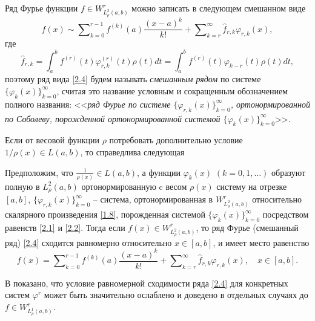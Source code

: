 Ряд Фурье функции $f\in W^r_{L^2_\rho(a,b)}$ можно записать в следующем смешанном виде
\begin{equation}\label{2.4}
f(x)\sim \sum\nolimits_{k=0}^{r-1} f^{(k)}(a)\frac{(x-a)^k}{k!}+ \sum\nolimits_{k=r}^\infty \hat f_{r,k}\varphi_{r,k}(x),
\end{equation}
где
\begin{equation}\label{2.5}
\hat f_{r,k}=\int_a^b f^{(r)}(t) \varphi^{(r)}_{r,k}(t)\rho(t)dt=\int_a^b f^{(r)}(t) \varphi_{k-r}(t)\rho(t)dt,
\end{equation}
поэтому ряд  вида \eqref{2.4} будем  называть \textit{смешанным рядом} по  системе $\{\varphi_{k}(x)\}_{k=0}^\infty$, считая это название условным и сокращенным обозначением полного названия: <<\textit{ряд Фурье по системе  $\{\varphi_{r,k}(x)\}_{k=0}^\infty$, ортонормированной по Соболеву, порожденной ортонормированной системой $\{\varphi_{k}(x)\}_{k=0}^\infty$}>>.


Если от весовой функции $\rho$ потребовать дополнительно условие $1/\rho(x)\in L(a,b)$, то   справедлива \cite{SharIzv2018}
следующая
\begin{theorem}\label{th2} Предположим, что  $ \frac{1}{\rho(x)}\in L(a,b) $, а  функции $\varphi_k(x)$ $(k=0,1,\ldots)$  образуют полную в $L^2_\rho(a,b)$ ортонормированную   c весом   $\rho(x)$ систему на отрезке $[a,b]$, $\{\varphi_{r,k}(x)\}_{k=0}^\infty$ -- система, ортонормированная в $W^r_{L^2_\rho(a,b)}$ относительно скалярного произведения \eqref{1.8},  порожденная системой $\{\varphi_{k}(x)\}_{k=0}^\infty$ посредством равенств \eqref{2.1} и \eqref{2.2}. Тогда если $f(x)\in W^r_{L^2_\rho(a,b)}$, то ряд Фурье (смешанный ряд) \eqref{2.4} сходится  равномерно относительно $x\in[a,b]$, и имеет место равенство
	\begin{equation*}
	f(x)= \sum\nolimits_{k=0}^{r-1} f^{(k)}(a)\frac{(x-a)^k}{k!}+ \sum\nolimits_{k=r}^\infty \hat f_{r,k}\varphi_{r,k}(x),\quad x\in[a,b].
	\end{equation*}
	
\end{theorem}

В  \cite{SharIzv2018} показано, что условие равномерной сходимости ряда \eqref{2.4} для конкретных систем $\varphi^r$ может быть значительно ослаблено и доведено в отдельных случаях до $f\in W^r_{L^1_\rho(a,b)}$.

